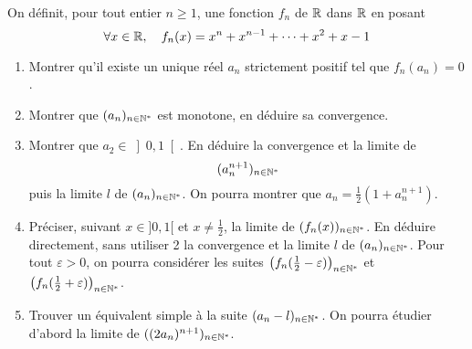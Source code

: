 On d{\'e}finit, pour tout entier $n\geq 1$, une fonction $f_n$ de $\mathbb{R} $ dans $\mathbb{R}$ en posant
\[
\forall x\in \mathbb{R},\quad f_n(x)=x^n+x^{n-1}+\cdots +x^2+x-1
\]
\begin{enumerate}
\item  Montrer qu'il existe un unique r{\'e}el $a_{n}$ strictement positif tel que $f_{n}(a_{n})=0$.

\item  Montrer que $(a_{n})_{n\in \mathbb{N}^{*}}$ est monotone, en d{\'e}duire sa convergence.

\item  Montrer que $a_{2}\in \left] 0,1\right[ $. En d{\'e}duire la convergence et la limite de
\[(a_{n}^{n+1})_{n\in \mathbb{N}^{*}}\]
puis la limite $l$ de $(a_{n})_{n\in \mathbb{N}^{*}}$.\newline 
On pourra montrer que $a_{n}=\frac{1}{2}(1+a_{n}^{n+1})$.

\item  Pr{\'e}ciser, suivant $x \in ]0, 1[$ et $x \neq \frac{1}{2}$, la limite de $(f_{n}(x))_{n\in \mathbb{N}^{*}}$. En d{\'e}duire directement,
sans utiliser 2 la convergence et la limite $l$ de $(a_{n})_{n\in \mathbb{N}^{*}}$.\newline
Pour tout $\varepsilon >0$, on pourra considérer les suites $\left( f_n(\frac{1}{2}-\varepsilon)\right)_{n\in \mathbb{N}^*}$ et $\left( f_n(\frac{1}{2}+\varepsilon)\right)_{n\in \mathbb{N}^*}$. 

\item  Trouver un {\'e}quivalent simple {\`a} la suite $(a_{n}-l)_{n \in \mathbb{N}^*}$.\newline
On pourra {\'e}tudier d'abord la limite de $((2a_{n})^{n+1})_{n\in \mathbb{N}^{*}}$.
\end{enumerate}
